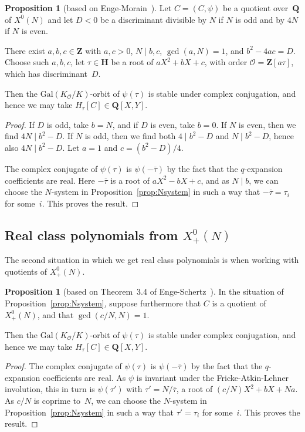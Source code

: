 \documentclass{amsart}
\newcommand{\QQ}{\mathbf{Q}}
\newcommand{\HH}{\mathbf{H}}
\newcommand{\ZZ}{\mathbf{Z}}
\newcommand{\Gal}{\mathrm{Gal}}
\newcommand{\mc}{\mathcal}
\newcommand{\xnul}[1]{X^0(#1)}
\newcommand{\xnulN}{\xnul{N}}
\newcommand{\xplus}[1]{X^0_+(#1)}
\newcommand{\xplusN}{\xplus{N}}
\numberwithin{equation}{section}
\theoremstyle{definition}
\newtheorem{proposition}[equation]{Proposition}
\begin{document}
\begin{proposition}[based on Enge-Morain~\cite{enge-morain2014}]
	\label{prop:realramified}
	Let $C = (C, \psi)$ be a quotient over~$\QQ$ of $\xnulN$
	and let $D<0$ be a discriminant divisible by $N$ if $N$ is odd
	and by $4N$ if $N$ is even.
	
	There exist $a,b,c\in\ZZ$ with $a,c>0$,
	$N\mid b,c$, $\gcd(a,N)=1$, and $b^2-4ac = D$.
	Choose such $a, b,c$,
	let $\tau\in\HH$ be a root of $aX^2 + bX + c$,
	with order
	$\mc{O} = \ZZ[a\tau]$, which
	has discriminant~$D$.
	
Then the $\Gal(K_{\mc{O}}/K)$-orbit of $\psi(\tau)$
is stable under complex conjugation,
and hence we may take $H_{\tau}[C]\in \QQ[X,Y]$.
\end{proposition}
\begin{proof}
If $D$ is odd, take $b=N$, and if $D$ is even, take $b=0$.
If $N$ is even, then we find $4N\mid b^2-D$.
If $N$ is odd, then we find both
$4\mid b^2-D$ and $N\mid b^2-D$,
hence also $4N\mid b^2-D$.
Let $a = 1$ and $c = (b^2-D)/4$.

The complex conjugate of $\psi(\tau)$
is $\psi(-\overline{\tau})$ by the fact that the $q$-expansion
coefficients are real.
Here $-\overline{\tau}$ is a root of $aX^2 - bX + c$,
and as $N\mid b$, we can choose the $N$-system
in Proposition~\ref{prop:Nsystem} in such a way that
$-\overline{\tau} =\tau_i$ for some~$i$.
This proves the result.
\end{proof}


\subsection{\texorpdfstring{Real class polynomials from $\xplusN$}{Real class polynomials from X0+(N)}}
\label{ssec:x0nplus}

The second situation in which we get real class polynomials
is when working with quotients of $\xplusN$.

\begin{proposition}[based on Theorem~3.4 of Enge-Schertz~\cite{enge-schertz2004}]\label{prop:realplus}
	In the situation of Proposition~\ref{prop:Nsystem},
	suppose furthermore that $C$ is a quotient of $\xplusN$,
	and that $\gcd(c/N,N) = 1$.
	
	Then the $\Gal(K_{\mc{O}}/K)$-orbit of $\psi(\tau)$
	is stable under complex conjugation,
	and hence we may take $H_{\tau}[C]\in \QQ[X,Y]$.
\end{proposition}
\begin{proof}
	The complex conjugate of $\psi(\tau)$
	is $\psi(-\overline{\tau})$ by the fact that the $q$-expansion
	coefficients are real.
	As $\psi$ is invariant under the Fricke-Atkin-Lehner involution,
	this in turn is $\psi(\tau')$
	with $\tau' = N/\overline{\tau}$,
	a root of $(c/N)X^2 + bX + Na$.
	As $c/N$ is coprime to~$N$, we can choose the $N$-system
	in Proposition~\ref{prop:Nsystem} in such a way that
	$\tau' =\tau_i$ for some~$i$.
	This proves the result.
\end{proof}
\end{document}
